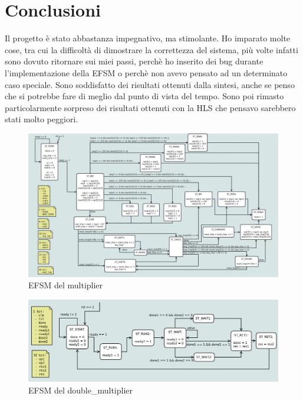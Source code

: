 \documentclass[]{IEEEtran}
\begin{document}
\section{Conclusioni}
Il progetto è stato abbastanza impegnativo, ma stimolante. Ho imparato molte cose, tra cui la difficoltà di dimostrare la correttezza del sistema, più volte infatti sono dovuto ritornare sui miei passi, perchè ho inserito dei bug durante l'implementazione della EFSM o perchè non avevo pensato ad un determinato caso speciale. Sono soddisfatto dei risultati ottenuti dalla sintesi, anche se penso che si potrebbe fare di meglio dal punto di vista del tempo. Sono poi rimasto particolarmente sorpreso dei risultati ottenuti con la HLS che pensavo sarebbero stati molto peggiori.



\nocite{*}


\appendix

\begin{figure}[bt]
    \centering
    \includegraphics[width=\textwidth]{figures/EFSM_mult}
    \caption{EFSM del multiplier}
    \label{fig:EFSM_MULT}
\end{figure}

\begin{figure}[bt]
    \centering
    \includegraphics[width=\textwidth]{figures/EFSM_dm}
    \caption{EFSM del double\_multiplier}
    \label{fig:EFSM_DM}
\end{figure}
\end{document}
